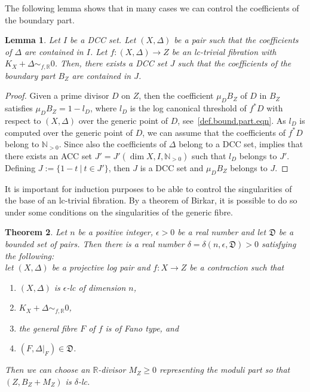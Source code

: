 \documentclass{amsart}[12pt,a4paper]
\newtheorem{theorem}{Theorem}[section]
\newtheorem{lemma}[theorem]{Lemma}
\theoremstyle{definition}
\newcommand{\rr}{\mathbb{R}}
\begin{document}
The following lemma shows that in many cases we can control the coefficients of the boundary part.
\begin{lemma}
\label{acc.lemma}
Let $I$ be a DCC set.
Let $(X, \Delta)$ be a pair such that the coefficients of $\Delta$ are contained in $I$.
Let $f \colon (X, \Delta) \to Z$ be an lc-trivial fibration with $K_X+ \Delta\sim_{f, \mathbb{R}}0$.
Then, there exists a DCC set $J$ such that the coefficients of the boundary part $B_Z$ are contained in $J$.
\end{lemma}

\begin{proof}
Given a prime divisor $D$ on $Z$, then the coefficient $\mu_D B_Z$ of $D$ in $B_Z$ satisfies $\mu_D B_Z = 1 -l_D$, where $l_D$ is the log canonical threshold of $f^\ast D$ with respect to $(X,\Delta)$ over the generic point of $D$, see~\eqref{def.bound.part.eqn}. 
As $l_D$ is computed over the generic point of $D$, we can assume that the coefficients of $f^\ast D$ belong to $\mathbb{N}_{>0}$. 
Since also the coefficients of $\Delta$ belong to a DCC set, \cite[Theorem 1.1]{HMX14} implies that there exists an ACC set $J'=J'(\dim X, I, \mathbb{N}_{>0})$ such that $l_D$ belongs to $J'$.
Defining $J:=\{1-t \ \vert \ t \in J'\}$, then $J$ is a DCC set and $\mu_D B_Z$ belongs to $J$.
\end{proof}

It is important for induction purposes to be able to control the singularities of the base of an lc-trivial fibration. 
By a theorem of Birkar, it is possible to do so under some conditions on the singularities
of the generic fibre.

\begin{theorem}
\cite[Theorem~1.4]{Bir16}
\label{birk.thm}
	Let $n$ be a positive integer, $\epsilon>0$ be a real number and let $\mathfrak{D}$ be a bounded set of pairs. 
	Then there is a real number $\delta=\delta(n,\epsilon,\mathfrak{D})>0$ satisfying the following: 
	\\
	let $(X,\Delta)$ be a projective log pair and $f\colon X \rightarrow Z$ be a contraction such that 
	\begin{enumerate}
		\item $(X,\Delta)$ is $\epsilon$-lc of dimension $n$,
		\item $K_X+\Delta \sim_{f, \rr} 0$,
		\item the general fibre $F$ of $f$ is of Fano type, and
		\item $(F,\Delta\vert_F)\in \mathfrak{D}$.
	\end{enumerate}
	Then we can choose an $\rr$-divisor $M_{Z}\geq 0$ representing the moduli part so that $(Z, B_Z+M_Z)$ is $\delta$-lc.
\end{theorem}
\end{document}
